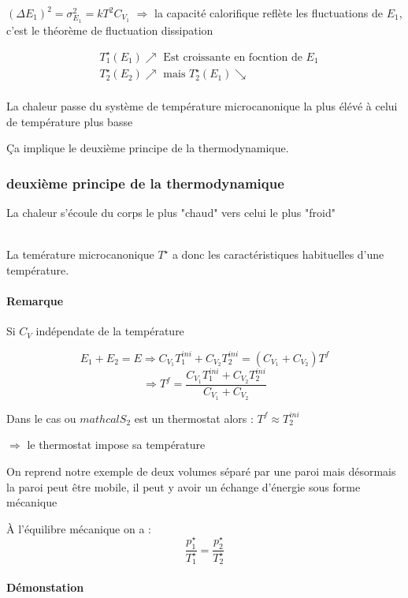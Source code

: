 \documentclass[12pt,a4paper]{report}
\begin{document}
	\((\Delta E_1)^2 = \sigma^2_{E_1} = kT^2 C_{V_1}\)
	\(\Rightarrow\) la capacité calorifique reflète les fluctuations de \(E_1\), c'est le théorème de 	fluctuation dissipation

\begin{align*}
	&T_1^\star (E_1) \nearrow \text{ Est croissante en focntion de } E_1\\
	&T_2^\star (E_2) \nearrow \text{ mais } T_2^\star (E_1) \searrow\\
\end{align*}

La chaleur passe du système de température microcanonique la plus élévé à celui de température plus basse

Ça implique le deuxième principe de la thermodynamique.
\subsubsection{deuxième principe de la thermodynamique}

	La chaleur s'écoule du corps le plus "chaud" vers celui le plus "froid"

\quad \\ %
La temérature microcanonique \(T^\star\) a donc les caractéristiques habituelles d'une température.

\paragraph{Remarque} Si \(C_V\) indépendate de la température

\[
	E_1 + E_2 = E \Rightarrow C_{V_1} T_1^{ini} + C_{V_2} T_2^{ini} = (C_{V_1} + C_{V_2}) T^f
\]
\[
	\Rightarrow T^f = \dfrac{C_{V_1} T_1^{ini} + C_{V_2} T_2^{ini}}{C_{V_1} + C_{V_2}}
\]

Dans le cas ou \(mathcal{S}_2\) est un thermostat alors : \(T^f \approx T_2^{ini}\)

\(\Rightarrow\) le thermostat impose sa température

On reprend notre exemple de deux volumes séparé par une paroi mais désormais la paroi peut être mobile, il peut y avoir un échange d'énergie sous forme mécanique

À l'équilibre mécanique on a :
\[
	\dfrac{p_1^\star}{T_1^\star} = \dfrac{p_2^\star}{T_2^\star}
\]

\paragraph{Démonstation} \quad \par
\end{document}
